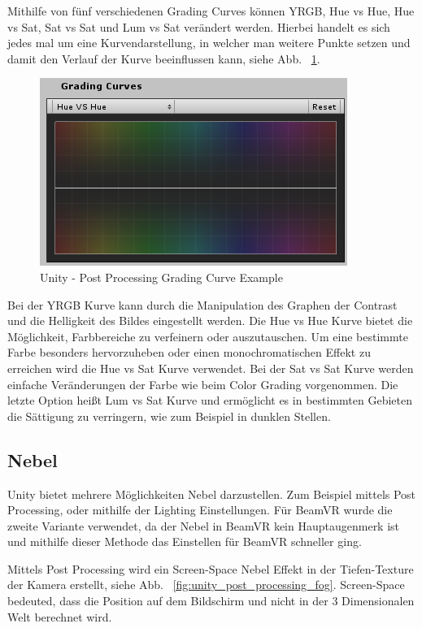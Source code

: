 Mithilfe von fünf verschiedenen Grading Curves können YRGB, Hue vs Hue, Hue vs Sat, Sat vs Sat und Lum vs Sat verändert werden.
Hierbei handelt es sich jedes mal um eine Kurvendarstellung, in welcher man weitere Punkte setzen und damit den Verlauf der Kurve beeinflussen kann, siehe Abb. ~\ref{fig:unity-post-processing-grading-curve-example}.
\begin {figure}
    \centering
    \includegraphics[scale=0.9]{pics/unity-post-processing-grading-curve-example}
    \caption{Unity - Post Processing Grading Curve Example}
    \label{fig:unity-post-processing-grading-curve-example}
\end {figure}
Bei der YRGB Kurve kann durch die Manipulation des Graphen der Contrast und die Helligkeit des Bildes eingestellt werden.
Die Hue vs Hue Kurve bietet die Möglichkeit, Farbbereiche zu verfeinern oder auszutauschen.
Um eine bestimmte Farbe besonders hervorzuheben oder einen monochromatischen Effekt zu erreichen wird die Hue vs Sat Kurve verwendet.
Bei der Sat vs Sat Kurve werden einfache Veränderungen der Farbe wie beim Color Grading vorgenommen.
Die letzte Option heißt Lum vs Sat Kurve und ermöglicht es in bestimmten Gebieten die Sättigung zu verringern, wie zum Beispiel in dunklen Stellen.

\subsection{Nebel}\label{subsec:fog-effect}
Unity bietet mehrere M\"oglichkeiten Nebel darzustellen.
Zum Beispiel mittels Post Processing, oder mithilfe der Lighting Einstellungen.
F\"ur BeamVR wurde die zweite Variante verwendet, da der Nebel in BeamVR kein Hauptaugenmerk ist und mithilfe dieser Methode das Einstellen für BeamVR schneller ging.
~\cite{Unity_Lighting_Window_2022}

Mittels Post Processing wird ein Screen-Space Nebel Effekt in der Tiefen-Texture der Kamera erstellt, siehe Abb. ~\ref{fig:unity_post_processing_fog}.
Screen-Space bedeuted, dass die Position auf dem Bildschirm und nicht in der 3 Dimensionalen Welt berechnet wird.
~\cite{Unity_Fog_2022}


